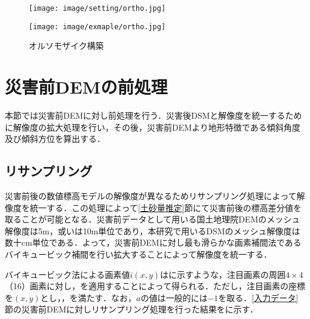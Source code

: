       \begin{figure}[t]
        \begin{minipage}[c]{0.45\hsize}
          \centering
          \texttt{[image: image/setting/ortho.jpg]}
        \end{minipage}
        \begin{minipage}[c]{0.45\hsize}
          \centering
          \texttt{[image: image/exmaple/ortho.jpg]}
        \end{minipage}
        \caption{オルソモザイク構築}
        \label{オルソモザイク構築結果}
      \end{figure}



  \section{災害前DEMの前処理}
    \label{災害前DEMの前処理}
    本節では災害前DEMに対し前処理を行う．災害後DSMと解像度を統一するために解像度の拡大処理を行い，その後，災害前DEMより地形特徴である傾斜角度及び傾斜方位を算出する．


    \subsection{リサンプリング}
      \label{リサンプリング}
      災害前後の数値標高モデルの解像度が異なるためリサンプリング処理によって解像度を統一する．この処理によって\ref{土砂量推定}節にて災害前後の標高差分値を取ることが可能となる．災害前データとして用いる国土地理院DEMのメッシュ解像度は5m，或いは10m単位であり，本研究で用いるDSMのメッシュ解像度は数十cm単位である．よって，災害前DEMに対し最も滑らかな画素補間法であるバイキュービック補間\cite{バイキュービック法}を行い拡大することによって解像度を統一する．
      
      バイキュービック法による画素値$i(x,y)$はに示すような，注目画素の周囲$4\times4$（16）画素に対し，を適用することによって得られる．ただし，注目画素の座標を$(x,y)$とし，，を満たす．なお，$a$の値は一般的には$-1$を取る．\ref{入力データ}節の災害前DEMに対しリサンプリング処理を行った結果をに示す．

